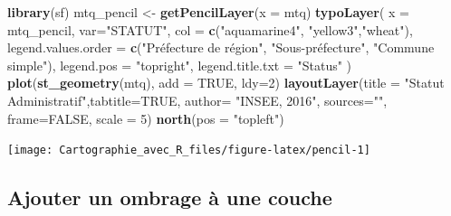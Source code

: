 \documentclass[]{book}
\newenvironment{Shaded}{\begin{snugshade}}{\end{snugshade}}
\newcommand{\KeywordTok}[1]{\textcolor[rgb]{0.13,0.29,0.53}{\textbf{#1}}}
\newcommand{\DataTypeTok}[1]{\textcolor[rgb]{0.13,0.29,0.53}{#1}}
\newcommand{\DecValTok}[1]{\textcolor[rgb]{0.00,0.00,0.81}{#1}}
\newcommand{\StringTok}[1]{\textcolor[rgb]{0.31,0.60,0.02}{#1}}
\newcommand{\OtherTok}[1]{\textcolor[rgb]{0.56,0.35,0.01}{#1}}
\newcommand{\NormalTok}[1]{#1}
\begin{document}
\begin{Shaded}
\begin{Highlighting}[]
\KeywordTok{library}\NormalTok{(sf)}
\NormalTok{mtq_pencil <-}\StringTok{ }\KeywordTok{getPencilLayer}\NormalTok{(}\DataTypeTok{x =}\NormalTok{ mtq)}
\KeywordTok{typoLayer}\NormalTok{(}
  \DataTypeTok{x =}\NormalTok{ mtq_pencil, }
  \DataTypeTok{var=}\StringTok{"STATUT"}\NormalTok{, }
  \DataTypeTok{col =} \KeywordTok{c}\NormalTok{(}\StringTok{"aquamarine4"}\NormalTok{, }\StringTok{"yellow3"}\NormalTok{,}\StringTok{"wheat"}\NormalTok{),}
  \DataTypeTok{legend.values.order =} \KeywordTok{c}\NormalTok{(}\StringTok{"Préfecture de région"}\NormalTok{,}
                          \StringTok{"Sous-préfecture"}\NormalTok{, }
                          \StringTok{"Commune simple"}\NormalTok{),}
  \DataTypeTok{legend.pos =} \StringTok{"topright"}\NormalTok{,}
  \DataTypeTok{legend.title.txt =} \StringTok{"Status"}
\NormalTok{)}
\KeywordTok{plot}\NormalTok{(}\KeywordTok{st_geometry}\NormalTok{(mtq), }\DataTypeTok{add =} \OtherTok{TRUE}\NormalTok{, }\DataTypeTok{ldy=}\DecValTok{2}\NormalTok{)}
\KeywordTok{layoutLayer}\NormalTok{(}\DataTypeTok{title =} \StringTok{"Statut Administratif"}\NormalTok{,}\DataTypeTok{tabtitle=}\OtherTok{TRUE}\NormalTok{,}
            \DataTypeTok{author=} \StringTok{"INSEE, 2016"}\NormalTok{, }\DataTypeTok{sources=}\StringTok{""}\NormalTok{, }
            \DataTypeTok{frame=}\OtherTok{FALSE}\NormalTok{, }\DataTypeTok{scale =} \DecValTok{5}\NormalTok{)}
\KeywordTok{north}\NormalTok{(}\DataTypeTok{pos =} \StringTok{"topleft"}\NormalTok{)}
\end{Highlighting}
\end{Shaded}

\begin{center}\texttt{[image: Cartographie\_avec\_R\_files/figure-latex/pencil-1]} \end{center}

\subsection{Ajouter un ombrage à une
couche}\label{ajouter-un-ombrage-a-une-couche}
\end{document}
